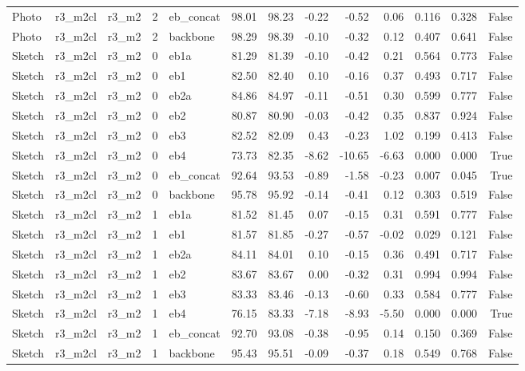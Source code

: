 \begin{table}
\begin{tabular}{lllrlrrrrrllr}
Photo & r3\_m2cl & r3\_m2 & 2 & eb\_concat & 98.01 & 98.23 & -0.22 & -0.52 & 0.06 & 0.116 & 0.328 & False \\
Photo & r3\_m2cl & r3\_m2 & 2 & backbone & 98.29 & 98.39 & -0.10 & -0.32 & 0.12 & 0.407 & 0.641 & False \\
Sketch & r3\_m2cl & r3\_m2 & 0 & eb1a & 81.29 & 81.39 & -0.10 & -0.42 & 0.21 & 0.564 & 0.773 & False \\
Sketch & r3\_m2cl & r3\_m2 & 0 & eb1 & 82.50 & 82.40 & 0.10 & -0.16 & 0.37 & 0.493 & 0.717 & False \\
Sketch & r3\_m2cl & r3\_m2 & 0 & eb2a & 84.86 & 84.97 & -0.11 & -0.51 & 0.30 & 0.599 & 0.777 & False \\
Sketch & r3\_m2cl & r3\_m2 & 0 & eb2 & 80.87 & 80.90 & -0.03 & -0.42 & 0.35 & 0.837 & 0.924 & False \\
Sketch & r3\_m2cl & r3\_m2 & 0 & eb3 & 82.52 & 82.09 & 0.43 & -0.23 & 1.02 & 0.199 & 0.413 & False \\
Sketch & r3\_m2cl & r3\_m2 & 0 & eb4 & 73.73 & 82.35 & -8.62 & -10.65 & -6.63 & 0.000 & 0.000 & True \\
Sketch & r3\_m2cl & r3\_m2 & 0 & eb\_concat & 92.64 & 93.53 & -0.89 & -1.58 & -0.23 & 0.007 & 0.045 & True \\
Sketch & r3\_m2cl & r3\_m2 & 0 & backbone & 95.78 & 95.92 & -0.14 & -0.41 & 0.12 & 0.303 & 0.519 & False \\
Sketch & r3\_m2cl & r3\_m2 & 1 & eb1a & 81.52 & 81.45 & 0.07 & -0.15 & 0.31 & 0.591 & 0.777 & False \\
Sketch & r3\_m2cl & r3\_m2 & 1 & eb1 & 81.57 & 81.85 & -0.27 & -0.57 & -0.02 & 0.029 & 0.121 & False \\
Sketch & r3\_m2cl & r3\_m2 & 1 & eb2a & 84.11 & 84.01 & 0.10 & -0.15 & 0.36 & 0.491 & 0.717 & False \\
Sketch & r3\_m2cl & r3\_m2 & 1 & eb2 & 83.67 & 83.67 & 0.00 & -0.32 & 0.31 & 0.994 & 0.994 & False \\
Sketch & r3\_m2cl & r3\_m2 & 1 & eb3 & 83.33 & 83.46 & -0.13 & -0.60 & 0.33 & 0.584 & 0.777 & False \\
Sketch & r3\_m2cl & r3\_m2 & 1 & eb4 & 76.15 & 83.33 & -7.18 & -8.93 & -5.50 & 0.000 & 0.000 & True \\
Sketch & r3\_m2cl & r3\_m2 & 1 & eb\_concat & 92.70 & 93.08 & -0.38 & -0.95 & 0.14 & 0.150 & 0.369 & False \\
Sketch & r3\_m2cl & r3\_m2 & 1 & backbone & 95.43 & 95.51 & -0.09 & -0.37 & 0.18 & 0.549 & 0.768 & False \\

\end{tabular}
\end{table}
